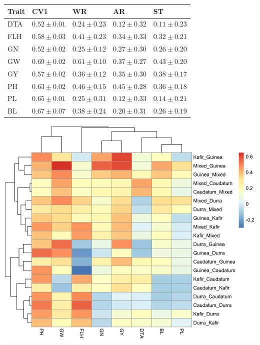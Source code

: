 \documentclass[a0,portrait]{a0poster}
\begin{document}
\begin{minipage}[c]{\linewidth}
\begin{framed}
\begin{multicols}{2}
\begin{center}
\begin{tabular}[width=0.9\textwidth]{ l  l  l  l  l }\\ \hline
Trait & CV1	& WR & AR & ST \\\hline
DTA	& $0.52\pm0.01$	& $0.24\pm0.23$	& $0.12\pm0.32$ & $0.11\pm0.23$\\
FLH	& $0.58\pm0.03$	& $0.41\pm0.23$	& $0.34\pm0.33$	& $0.32\pm0.21$\\
GN	& $0.52\pm0.02$	& $0.25\pm0.12$	& $0.27\pm0.30$	& $0.26\pm0.20$\\
GW	& $0.69\pm0.02$	& $0.61\pm0.10$	& $0.37\pm0.27$	& $0.43\pm0.20$\\
GY	& $0.57\pm0.02$	& $0.36\pm0.12$	& $0.35\pm0.30$	& $0.38\pm0.17$\\
PH	& $0.63\pm0.02$	& $0.46\pm0.15$	& $0.45\pm0.28$	& $0.36\pm0.18$\\
PL	& $0.65\pm0.01$	& $0.25\pm0.31$	& $0.12\pm0.33$	& $0.14\pm0.21$\\
BL	& $0.67\pm0.07$	& $0.38\pm0.24$	& $0.20\pm0.31$	& $0.26\pm0.19$\\\hline
\end{tabular}
\end{center}
\smallskip
\begin{center}
\includegraphics[width=\linewidth]{figures/SRT_accuracy}

\end{center}
\end{multicols}
\end{framed}
\end{minipage}
\end{document}
